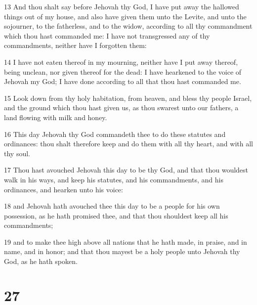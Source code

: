 \par 13 And thou shalt say before Jehovah thy God, I have put away the hallowed things out of my house, and also have given them unto the Levite, and unto the sojourner, to the fatherless, and to the widow, according to all thy commandment which thou hast commanded me: I have not transgressed any of thy commandments, neither have I forgotten them:
\par 14 I have not eaten thereof in my mourning, neither have I put away thereof, being unclean, nor given thereof for the dead: I have hearkened to the voice of Jehovah my God; I have done according to all that thou hast commanded me.
\par 15 Look down from thy holy habitation, from heaven, and bless thy people Israel, and the ground which thou hast given us, as thou swarest unto our fathers, a land flowing with milk and honey.
\par 16 This day Jehovah thy God commandeth thee to do these statutes and ordinances: thou shalt therefore keep and do them with all thy heart, and with all thy soul.
\par 17 Thou hast avouched Jehovah this day to be thy God, and that thou wouldest walk in his ways, and keep his statutes, and his commandments, and his ordinances, and hearken unto his voice:
\par 18 and Jehovah hath avouched thee this day to be a people for his own possession, as he hath promised thee, and that thou shouldest keep all his commandments;
\par 19 and to make thee high above all nations that he hath made, in praise, and in name, and in honor; and that thou mayest be a holy people unto Jehovah thy God, as he hath spoken.

\chapter{27}

